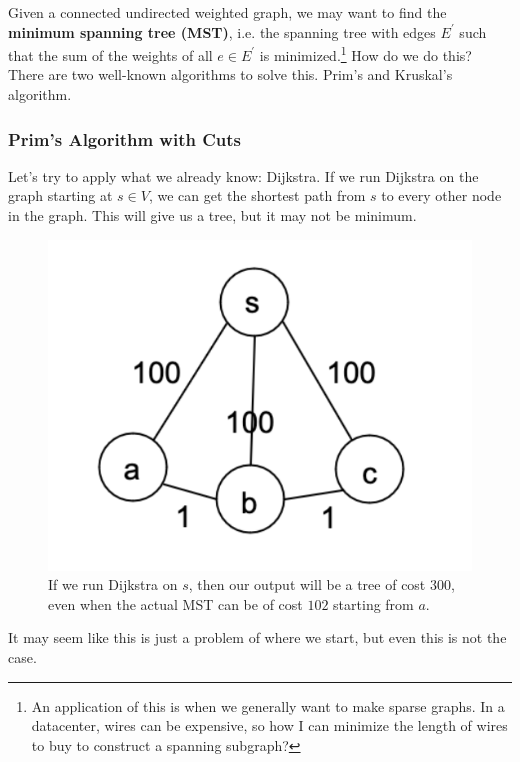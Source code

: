 \documentclass{article}
\begin{document}
      Given a connected undirected weighted graph, we may want to find the \textbf{minimum spanning tree (MST)}, i.e. the spanning tree with edges $E^\prime$ such that the sum of the weights of all $e \in E^\prime$ is minimized.\footnote{An application of this is when we generally want to make sparse graphs. In a datacenter, wires can be expensive, so how I can minimize the length of wires to buy to construct a spanning subgraph?} How do we do this? There are two well-known algorithms to solve this. Prim's and Kruskal's algorithm.  
    
    \subsubsection{Prim's Algorithm with Cuts}

      Let's try to apply what we already know: Dijkstra. If we run Dijkstra on the graph starting at $s \in V$, we can get the shortest path from $s$ to every other node in the graph. This will give us a tree, but it may not be minimum. 

      \begin{figure}[H]
        \centering 
        \includegraphics[scale=0.6]{img/dik_mst_prob.png}
        \caption{If we run Dijkstra on $s$, then our output will be a tree of cost $300$, even when the actual MST can be of cost $102$ starting from $a$.} 
        \label{fig:dik_mst_prob}
      \end{figure}

      It may seem like this is just a problem of where we start, but even this is not the case. 
\end{document}
